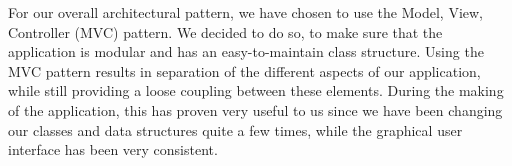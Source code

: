 For our overall architectural pattern, we have chosen to use the Model, View, Controller (MVC) pattern. We decided to do so, to make sure that the application is modular and has an easy-to-maintain class structure. Using the MVC pattern results in separation of the different aspects of our application, while still providing a loose coupling between these elements. During the making of the application, this has proven very useful to us since we have been changing our classes and data structures quite a few times, while the graphical user interface has been very consistent.